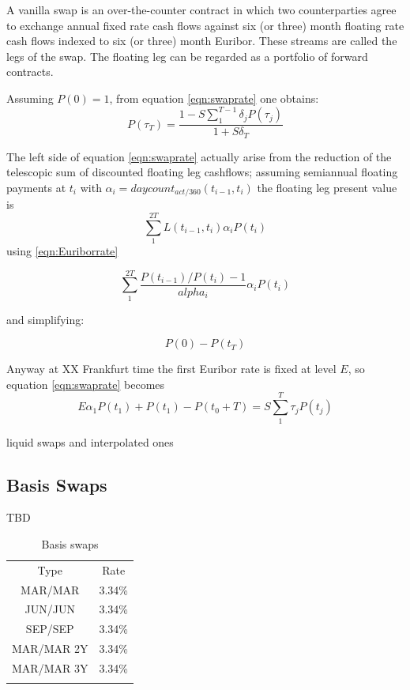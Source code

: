 \documentclass[11pt,reqno]{amsart}
\begin{document}
A vanilla swap is an over-the-counter contract in which two counterparties agree to exchange annual fixed rate cash flows against six (or three) month floating rate cash flows indexed to six (or three) month Euribor. These streams are called the legs of the swap. The floating leg can be regarded as a portfolio of forward contracts.

Assuming $P(0)=1$, from equation \ref{eqn:swaprate} one obtains:
\begin{equation}
P(\tau_T) = \frac
    {1 - S \sum_1^{T-1} \delta_j P(\tau_j)}
    {1+S \delta_T}
\label{eqn:discfromswaprate}
\end{equation}

The left side of equation \ref{eqn:swaprate} actually arise from the reduction of the telescopic sum of discounted floating leg cashflows; assuming semiannual floating payments at $t_i$ with $\alpha_i=daycount_{act/360}(t_{i-1},t_i) $ the floating leg present value is
\begin{equation}
\sum_1^{2T} L(t_{i-1},t_i) \alpha_i P(t_i)
\label{eqn:discfloatlegcf}
\end{equation}
using \ref{eqn:Euriborrate}

\begin{equation}
\sum_1^{2T} \frac{P(t_{i-1}) / P(t_i) - 1}{alpha_i} \alpha_i P(t_i)
\end{equation}

and simplifying:

\begin{equation}
P(0)-P(t_T)
\end{equation}

Anyway at XX Frankfurt time the first Euribor rate is fixed at level $E$, so equation \ref{eqn:swaprate} becomes
\begin{equation}
E \alpha_1 P(t_1) + P(t_1) - P(t_0+T) = S \sum_1^T \tau_j P(t_j)
\label{eqn:swapratewithfixingeffect}
\end{equation}


liquid swaps and interpolated ones


\subsection{\label{SecBasis}Basis Swaps}
TBD
\begin{table}[tbp]
\label{tab:basisSwaps}
\begin{tabular}{cc}
Type & Rate \\
MAR/MAR & 3.34\% \\
JUN/JUN & 3.34\% \\
SEP/SEP & 3.34\% \\
MAR/MAR 2Y & 3.34\% \\
MAR/MAR 3Y & 3.34\% \\
&
\end{tabular}%
\caption{Basis swaps}
\end{table}
\end{document}
